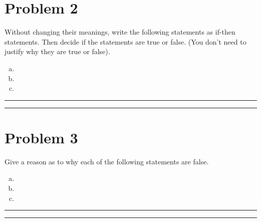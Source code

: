 \documentclass{article}
\theoremstyle{definition}
\newenvironment{solution}{\bigskip\hrule{\hfill}}{\bigskip\hrule{\hfill}} %
\begin{document}
\section*{Problem 2}

Without changing their meanings, write the following statements as if-then statements. Then decide if the statements are true or false. (You don't need to justify why they are true or false).

\begin{enumerate}[a)] %
    \item 

    \item 

    \item 
\end{enumerate}

\begin{solution}


\end{solution}


\newpage


\section*{Problem 3}

Give a reason as to why each of the following statements are false.

\begin{enumerate}[a)] %
    \item 

    \item 

    \item 
\end{enumerate}

\begin{solution}


\end{solution}
\end{document}
